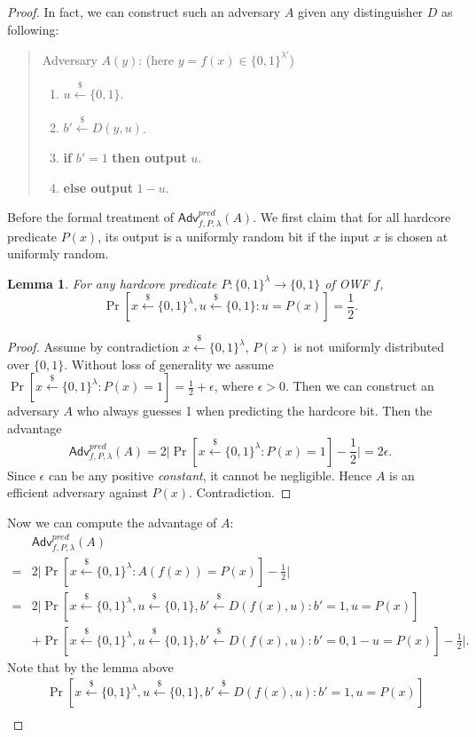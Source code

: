 \documentclass[12pt]{article}
\newcommand{\bits}{\{0,1\}}
\newcommand{\getsr}{\stackrel{\$}{\gets}}
\newcommand{\Adv}{\textsf{Adv}}
\newtheorem{lemma}[theorem]{Lemma}
\theoremstyle{definition}
\begin{document}
\begin{proof}
In fact, we can construct such an adversary $A$ given any distinguisher $D$ as following:
\begin{quote}
Adversary $A(y)$: (here $y=f(x)\in\bits^{\lambda'}$)
\begin{enumerate}
\item $u \getsr \bits$.
\item $b' \getsr D(y,u)$.
\item {\bf if} $b'=1$ {\bf then output} $u$.
\item {\bf else output} $1-u$.
\end{enumerate}
\end{quote}
Before the formal treatment of $\Adv_{f,P,\lambda}^{pred}(A)$. We first claim that for all hardcore predicate $P(x)$, its output is a uniformly random bit if the input $x$ is chosen at uniformly random.
\begin{lemma}
For any hardcore predicate $P : \bits^\lambda \to \bits$ of OWF $f$,
$$\Pr[x\getsr\bits^\lambda, u\getsr\bits : u = P(x)] = \frac{1}{2}.$$
\end{lemma}
\begin{proof}
Assume by contradiction $x\getsr\bits^\lambda$, $P(x)$ is not uniformly distributed over $\bits$. Without loss of generality we assume $\Pr[x\getsr\bits^\lambda: P(x)=1] = \frac{1}{2}+\epsilon$, where $\epsilon>0$. Then we can construct an adversary $A$ who always guesses 1 when predicting the hardcore bit. Then the advantage
$$\Adv_{f,P,\lambda}^{pred}(A) = 2\bigg| \Pr[x\getsr\bits^\lambda: P(x)=1] -\frac{1}{2} \bigg| = 2\epsilon.$$
Since $\epsilon$ can be any positive \emph{constant}, it cannot be negligible. Hence $A$ is an efficient adversary against $P(x)$. Contradiction.
\end{proof}
Now we can compute the advantage of $A$:
$$
\begin{aligned}
&\Adv_{f,P,\lambda}^{pred}(A) \\
=& 2\bigg| \Pr[x\getsr\bits^\lambda: A(f(x)) = P(x)] - \frac{1}{2} \bigg| \\
=& 2\bigg| \Pr[x\getsr\bits^\lambda, u\getsr\bits, b'\getsr D(f(x),u): b'=1, u = P(x)]\\
&+ \Pr[x\getsr\bits^\lambda, u\getsr\bits, b'\getsr D(f(x),u): b'=0, 1-u = P(x)] - \frac{1}{2} \bigg|.
\end{aligned}
$$
Note that by the lemma above
$$\begin{aligned}
&\Pr[x\getsr\bits^\lambda, u\getsr\bits, b'\getsr D(f(x),u): b'=1, u = P(x)] \\

\end{aligned}$$
\end{proof}
\end{document}
